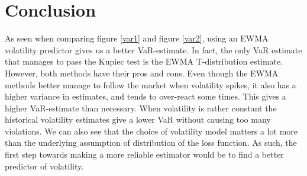 \documentclass[a4paper]{article}
\begin{document}
\section{Conclusion}
As seen when comparing figure \ref{var1} and figure \ref{var2}, using an EWMA volatility predictor gives us a better VaR-estimate. In fact, the only VaR estimate that manages to pass the Kupiec test is the EWMA T-distribution estimate. However, both methods have their pros and cons. Even though the EWMA methods better manage to follow the market when volatility spikes, it also has a higher variance in estimates, and tends to over-react some times. This gives a higher VaR-estimate than necessary. When volatility is rather constant the historical volatility estimates give a lower VaR without causing too many violations. \newline
We can also see that the choice of volatility model matters a lot more than the underlying assumption of distribution of the loss function. As such, the first step towards making a more reliable estimator would be to find a better predictor of volatility.
\end{document}
